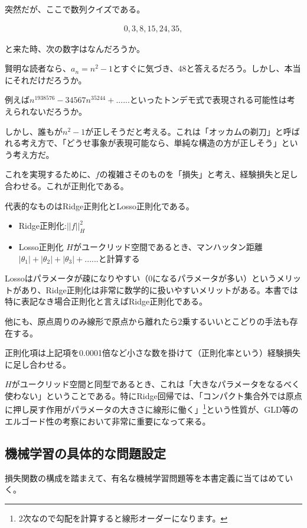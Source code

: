 \documentclass{jsarticle}
\begin{document}
突然だが、ここで数列クイズである。

\begin{align}
0,3,8,15,24,35,
\end{align}

と来た時、次の数字はなんだろうか。

賢明な読者なら、$a_n=n^2-1$とすぐに気づき、48と答えるだろう。しかし、本当にそれだけだろうか。

例えば$n^1938576-34567n^35244+......$といったトンデモ式で表現される可能性は考えられないだろうか。

しかし、誰もが$n^2-1$が正しそうだと考える。これは「オッカムの剃刀」と呼ばれる考え方で、「どうせ事象が表現可能なら、単純な構造の方が正しそう」という考え方だ。

これを実現するために、$f$の複雑さそのものを「損失」と考え、経験損失と足し合わせる。これが正則化である。

代表的なものはRidge正則化とLosso正則化である。

\begin{itemize} 
\item Ridge正則化:$||f||^2_H$
\item Losso正則化 $H$がユークリッド空間であるとき、マンハッタン距離$|\theta_1|+|\theta_2|+|\theta_3|+......$と計算する
\end{itemize}

Lossoはパラメータが疎になりやすい（0になるパラメータが多い）というメリットがあり、Ridge正則化は非常に数学的に扱いやすいメリットがある。本書では特に表記なき場合正則化と言えばRidge正則化である。

他にも、原点周りのみ線形で原点から離れたら2乗するいいとこどりの手法も存在する。

正則化項は上記項を0.0001倍など小さな数を掛けて（正則化率という）経験損失に足し合わせる。

$H$がユークリッド空間と同型であるとき、これは「大きなパラメータをなるべく使わない」ということである。特にRidge回帰では、「コンパクト集合外では原点に押し戻す作用がパラメータの大きさに線形に働く」\footnote{2次なので勾配を計算すると線形オーダーになります。}という性質が、GLD等のエルゴード性の考察において非常に重要になって来る。

\subsection{機械学習の具体的な問題設定}
損失関数の構成を踏まえて、有名な機械学習問題等を本書定義に当てはめていく。
\end{document}
